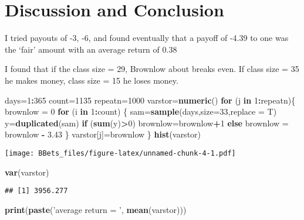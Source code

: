 \documentclass[]{article}
\newenvironment{Shaded}{\begin{snugshade}}{\end{snugshade}}
\newcommand{\KeywordTok}[1]{\textcolor[rgb]{0.13,0.29,0.53}{\textbf{#1}}}
\newcommand{\DataTypeTok}[1]{\textcolor[rgb]{0.13,0.29,0.53}{#1}}
\newcommand{\DecValTok}[1]{\textcolor[rgb]{0.00,0.00,0.81}{#1}}
\newcommand{\FloatTok}[1]{\textcolor[rgb]{0.00,0.00,0.81}{#1}}
\newcommand{\StringTok}[1]{\textcolor[rgb]{0.31,0.60,0.02}{#1}}
\newcommand{\ControlFlowTok}[1]{\textcolor[rgb]{0.13,0.29,0.53}{\textbf{#1}}}
\newcommand{\OperatorTok}[1]{\textcolor[rgb]{0.81,0.36,0.00}{\textbf{#1}}}
\newcommand{\NormalTok}[1]{#1}
\begin{document}
\section{Discussion and Conclusion}\label{discussion-and-conclusion}

I tried payouts of -3, -6, and found eventually that a payoff of -4.39
to one was the `fair' amount with an average return of 0.38

I found that if the class size = 29, Brownlow about breaks even. If
class size = 35 he makes money, class size = 15 he loses money.

\begin{Shaded}
\begin{Highlighting}[]
\NormalTok{days=}\DecValTok{1}\OperatorTok{:}\DecValTok{365}
\NormalTok{count=}\DecValTok{1135}
\NormalTok{repeatn=}\DecValTok{1000}
\NormalTok{varstor=}\KeywordTok{numeric}\NormalTok{()}
\ControlFlowTok{for}\NormalTok{ (j }\ControlFlowTok{in} \DecValTok{1}\OperatorTok{:}\NormalTok{repeatn)\{}
\NormalTok{brownlow =}\StringTok{ }\DecValTok{0}
\ControlFlowTok{for}\NormalTok{ (i }\ControlFlowTok{in} \DecValTok{1}\OperatorTok{:}\NormalTok{count) \{}
\NormalTok{  sam=}\KeywordTok{sample}\NormalTok{(days,}\DataTypeTok{size=}\DecValTok{33}\NormalTok{,}\DataTypeTok{replace =}\NormalTok{ T)}
\NormalTok{  y=}\KeywordTok{duplicated}\NormalTok{(sam)}
  \ControlFlowTok{if}\NormalTok{ (}\KeywordTok{sum}\NormalTok{(y)}\OperatorTok{>}\DecValTok{0}\NormalTok{) brownlow=brownlow}\OperatorTok{+}\DecValTok{1}
  \ControlFlowTok{else}\NormalTok{ brownlow =}\StringTok{ }\NormalTok{brownlow }\OperatorTok{-}\StringTok{ }\FloatTok{3.43}
\NormalTok{\}}
\NormalTok{varstor[j]=brownlow}
\NormalTok{\}}
\KeywordTok{hist}\NormalTok{(varstor)}
\end{Highlighting}
\end{Shaded}

\texttt{[image: BBets\_files/figure-latex/unnamed-chunk-4-1.pdf]}

\begin{Shaded}
\begin{Highlighting}[]
\KeywordTok{var}\NormalTok{(varstor)}
\end{Highlighting}
\end{Shaded}

\begin{verbatim}
## [1] 3956.277
\end{verbatim}

\begin{Shaded}
\begin{Highlighting}[]
\KeywordTok{print}\NormalTok{(}\KeywordTok{paste}\NormalTok{(}\StringTok{'average return = '}\NormalTok{, }\KeywordTok{mean}\NormalTok{(varstor)))}
\end{Highlighting}
\end{Shaded}
\end{document}
